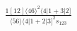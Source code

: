 \documentclass[varwidth, border=5pt]{standalone}
\begin{document}
\begin{my}
$\begin{gathered}
\scriptscriptstyle\frac{1[12]⟨46⟩^2⟨4|1+3|2]}{⟨56⟩⟨4|1+2|3]^2s_{123}}
\end{gathered}$
\end{my}
\end{document}
